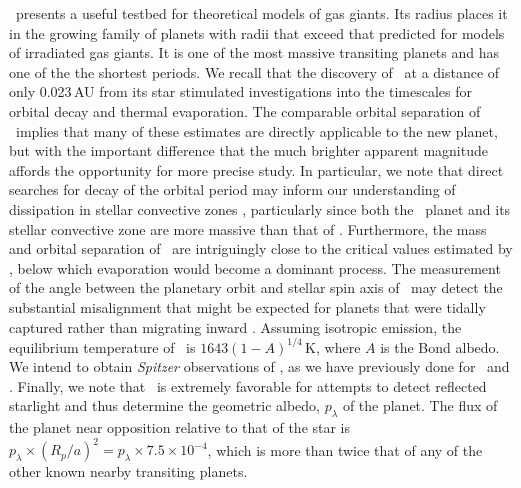 \tresThree\ presents a useful testbed for theoretical models of gas giants.
Its radius places it in the growing family of planets with radii that exceed that predicted for models of irradiated gas giants.
It is one of the most massive transiting planets and has one of the the shortest periods.
We recall that the discovery of \ogletrFSb\ at a distance of only 0.023\,AU from its star stimulated investigations into the timescales for orbital decay and thermal evaporation.
The comparable orbital separation of \tresThree\ implies that many of these estimates are directly applicable to the new planet, but with the important difference that the much brighter apparent magnitude affords the opportunity for more precise study.
In particular, we note that direct searches for decay of the orbital period may inform our understanding of dissipation in stellar convective zones \citep{Sasselov:apj:2003a}, particularly since both the \tresThree\ planet and its stellar convective zone are more massive than that of \ogletrFSb.
Furthermore, the mass and orbital separation of \tresThree\ are intriguingly close to the critical values estimated by \citet{Baraffe_Selsis_Chabrier:aa:2004a}, below which evaporation would become a dominant process.
The measurement of the angle between the planetary orbit and stellar spin axis of \tresThree\ may detect the substantial misalignment that might be expected for planets that were tidally captured rather than migrating inward \citep{Gaudi_Winn:apj:2007a}.
Assuming isotropic emission, the equilibrium temperature of \tresThree\ is $1643(1-A)^{1/4}$\,K, where $A$ is the Bond albedo.
We intend to obtain {\it Spitzer} observations of \tresThree, as we have previously done for \tresOne\ and \tresTwo.
Finally, we note that \tresThree\ is extremely favorable for attempts to detect reflected starlight \citep{Charbonneau_Noyes_Korzennik:apjl:1999a, Leigh_Collier-Cameron_Udry:mnras:2003a, Rowe_Matthews_Seager:apj:2006a} and thus determine the geometric albedo, $p_{\lambda}$ of the planet.
The flux of the planet near opposition relative to that of the star is $p_{\lambda} \times (R_p / a)^2 = p_{\lambda} \times 7.5 \times 10^{-4}$, which is more than twice that of any of the other known nearby transiting planets.
